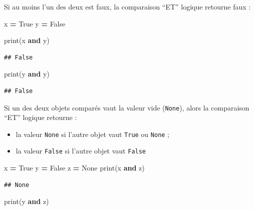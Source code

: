 \documentclass[
  12pt,
]{book}
\newenvironment{Shaded}{\begin{snugshade}}{\end{snugshade}}
\newcommand{\BuiltInTok}[1]{#1}
\newcommand{\KeywordTok}[1]{\textcolor[rgb]{0.13,0.29,0.53}{\textbf{#1}}}
\newcommand{\NormalTok}[1]{#1}
\newcommand{\OperatorTok}[1]{\textcolor[rgb]{0.81,0.36,0.00}{\textbf{#1}}}
\newcommand{\VariableTok}[1]{\textcolor[rgb]{0.00,0.00,0.00}{#1}}
\providecommand{\tightlist}{%
  \setlength{\itemsep}{0pt}\setlength{\parskip}{0pt}}
\numberwithin{equation}{section}
\numberwithin{countremarque}{section}
\begin{document}
Si au moins l'un des deux est faux, la comparaison ``ET'' logique retourne faux :

\begin{Shaded}
\begin{Highlighting}[]
\NormalTok{x }\OperatorTok{=} \VariableTok{True}
\NormalTok{y }\OperatorTok{=} \VariableTok{False}

\BuiltInTok{print}\NormalTok{(x }\KeywordTok{and}\NormalTok{ y)}
\end{Highlighting}
\end{Shaded}

\begin{lstlisting}
## False
\end{lstlisting}

\begin{Shaded}
\begin{Highlighting}[]
\BuiltInTok{print}\NormalTok{(y }\KeywordTok{and}\NormalTok{ y)}
\end{Highlighting}
\end{Shaded}

\begin{lstlisting}
## False
\end{lstlisting}

Si un des deux objets comparés vaut la valeur vide (\texttt{None}), alors la comparaison ``ET'' logique retourne :

\begin{itemize}
\tightlist
\item
  la valeur \texttt{None} si l'autre objet vaut \texttt{True} ou \texttt{None} ;
\item
  la valeur \texttt{False} si l'autre objet vaut \texttt{False}
\end{itemize}

\begin{Shaded}
\begin{Highlighting}[]
\NormalTok{x }\OperatorTok{=} \VariableTok{True}
\NormalTok{y }\OperatorTok{=} \VariableTok{False}
\NormalTok{z }\OperatorTok{=} \VariableTok{None}
\BuiltInTok{print}\NormalTok{(x }\KeywordTok{and}\NormalTok{ z)}
\end{Highlighting}
\end{Shaded}

\begin{lstlisting}
## None
\end{lstlisting}

\begin{Shaded}
\begin{Highlighting}[]
\BuiltInTok{print}\NormalTok{(y }\KeywordTok{and}\NormalTok{ z)}
\end{Highlighting}
\end{Shaded}
\end{document}
